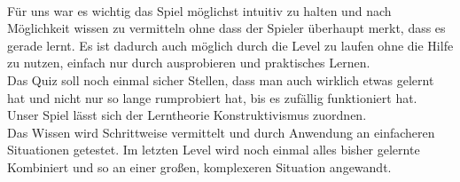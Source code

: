 \documentclass[10pt,a4paper,notitlepage]{report}
\begin{document}
	\\\par\medskip\Text
	Für uns war es wichtig das Spiel möglichst intuitiv zu halten und nach Möglichkeit wissen zu vermitteln ohne dass der Spieler überhaupt merkt, dass es gerade lernt. Es ist dadurch auch möglich durch die Level zu laufen ohne die Hilfe zu nutzen, einfach nur durch ausprobieren und praktisches Lernen.\\
	Das Quiz soll noch einmal sicher Stellen, dass man auch wirklich etwas gelernt hat und nicht nur so lange rumprobiert hat, bis es zufällig funktioniert hat.\\
	Unser Spiel lässt sich der Lerntheorie Konstruktivismus zuordnen.\\
	Das Wissen wird Schrittweise vermittelt und durch Anwendung an einfacheren Situationen getestet. Im letzten Level wird noch einmal alles bisher gelernte Kombiniert und so an einer großen, komplexeren Situation angewandt.\\\par\smallskip
	
\end{document}
